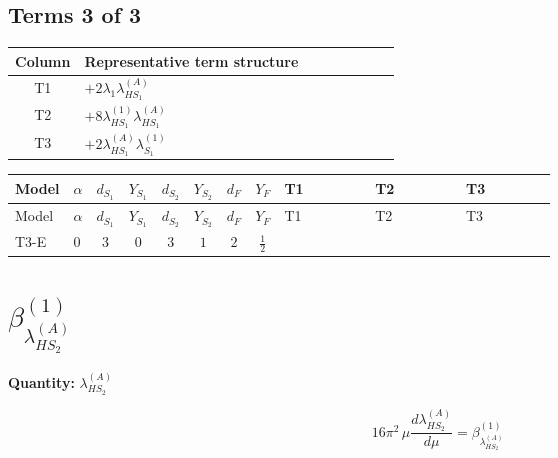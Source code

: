 \documentclass[8pt]{article}
\begin{document}
\begin{landscape}
\subsection*{Terms 3 of 3}
\begin{center}
\begin{tabular}{@{}c >{\raggedright\arraybackslash}p{0.82\linewidth}@{}}
\toprule
Column & Representative term structure \\
\midrule
T1 & \(\displaystyle +2 {\lambda_1} {\lambda_{HS_1}^{(A)}}\) \\
\midrule
T2 & \(\displaystyle +8 {\lambda_{HS_1}^{(1)}} {\lambda_{HS_1}^{(A)}}\) \\
\midrule
T3 & \(\displaystyle +2 {\lambda_{HS_1}^{(A)}} {\lambda_{S_1}^{(1)}}\) \\
\midrule
\bottomrule
\end{tabular}
\end{center}
\smallskip
\tiny
\begin{longtable}{@{}llcccccc >{\raggedright\arraybackslash}p{0.21\linewidth} >{\raggedright\arraybackslash}p{0.21\linewidth} >{\raggedright\arraybackslash}p{0.21\linewidth}@{}}
\toprule
Model & $\alpha$ & $d_{S_1}$ & $Y_{S_1}$ & $d_{S_2}$ & $Y_{S_2}$ & $d_F$ & $Y_F$ & T1 & T2 & T3 \\
\midrule
\endfirsthead
\toprule
Model & $\alpha$ & $d_{S_1}$ & $Y_{S_1}$ & $d_{S_2}$ & $Y_{S_2}$ & $d_F$ & $Y_F$ & T1 & T2 & T3 \\
\midrule
\endhead
T3-E & $0$ & $3$ & $0$ & $3$ & $1$ & $2$ & $\frac{1}{2}$ & \scriptsize\adjustbox{max width=\linewidth}{$\begin{gathered} +2 {\lambda_1} {\lambda_{HS_1}^{(A)}}\end{gathered}$} & \scriptsize\adjustbox{max width=\linewidth}{$\begin{gathered} +8 {\lambda_{HS_1}^{(1)}} {\lambda_{HS_1}^{(A)}}\end{gathered}$} & \scriptsize\adjustbox{max width=\linewidth}{$\begin{gathered} +2 {\lambda_{HS_1}^{(A)}} {\lambda_{S_1}^{(1)}}\end{gathered}$} \\
\midrule
\bottomrule
\end{longtable}
\clearpage
\section*{$\beta_{\lambda_{HS_2}^{(A)}}^{(1)}$}
\noindent\textbf{Quantity: }$\lambda_{HS_2}^{(A)}$\par\smallskip
\[16\pi^2\,\mu\frac{d \lambda_{HS_2}^{(A)}}{d\mu}=\beta_{\lambda_{HS_2}^{(A)}}^{(1)}\]

\end{landscape}
\end{document}
